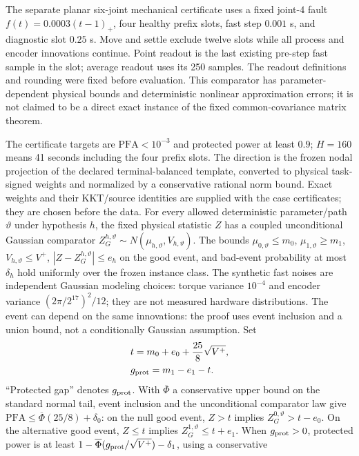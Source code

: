 \documentclass[journal]{IEEEtran}
\begin{document}
The separate planar six-joint mechanical certificate uses a fixed joint-4
fault $f(t)=0.0003(t-1)_+$, four healthy prefix slots, fast step $0.001$ s,
and diagnostic slot $0.25$ s. Move and settle exclude twelve slots while
all process and encoder innovations continue. Point readout is the last
existing pre-step fast sample in the slot; average readout uses its 250 samples.
The readout definitions and rounding were fixed before evaluation.
This comparator has parameter-dependent physical bounds and deterministic
nonlinear approximation errors; it is not claimed to be a direct exact
instance of the fixed common-covariance matrix theorem.


The certificate targets are $\mathrm{PFA}<10^{-3}$ and protected power
at least $0.9$; $H=160$ means 41 seconds including the four prefix slots.
The direction is the frozen nodal projection of the declared terminal-balanced
template, converted to physical task-signed weights and normalized by a
conservative rational norm bound. Exact weights and their KKT/source identities
are supplied with the case certificates; they are chosen before the data.
For every allowed deterministic parameter/path $\vartheta$ under hypothesis $h$,
the fixed physical statistic $Z$ has a coupled unconditional Gaussian comparator
$Z_G^{h,\vartheta}\sim N(\mu_{h,\vartheta},V_{h,\vartheta})$.
The bounds $\mu_{0,\vartheta}\le m_0$, $\mu_{1,\vartheta}\ge m_1$,
$V_{h,\vartheta}\le V^+$, $|Z-Z_G^{h,\vartheta}|\le e_h$ on the good event,
and bad-event probability at most $\delta_h$ hold uniformly over the frozen
instance class. The synthetic fast noises are independent Gaussian modeling
choices: torque variance $10^{-4}$ and encoder variance
$(2\pi/2^{17})^2/12$; they are not measured hardware distributions.
The event can depend on the same innovations: the proof uses event
inclusion and a union bound, not a conditionally Gaussian assumption.
Set
\[
\begin{aligned}
&t=m_0+e_0+\frac{25}{8}\sqrt{V^+},\\
&g_{\rm prot}=m_1-e_1-t.
\end{aligned}
\]
``Protected gap'' denotes $g_{\rm prot}$. With $\overline\Phi$ a conservative upper bound on the standard normal tail,
event inclusion and the unconditional comparator law give
$\mathrm{PFA}\le\overline\Phi(25/8)+\delta_0$: on the null good event,
$Z>t$ implies $Z_G^{0,\vartheta}>t-e_0$.
On the alternative good event, $Z\le t$ implies
$Z_G^{1,\vartheta}\le t+e_1$. When $g_{\rm prot}>0$, protected power is at least
$1-\overline\Phi(g_{\rm prot}/\sqrt{V^+})-\delta_1$, using a conservative
\end{document}
